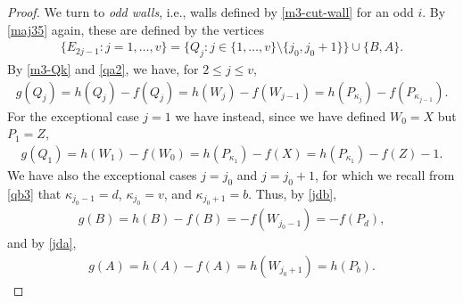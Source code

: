 \documentclass[11pt,reqno,tbtags,a4paper]{amsart}
\numberwithin{equation}{section}
\renewcommand\le{\leq}
\renewcommand\leq{\leqslant}
\theoremstyle{plain}%
\theoremstyle{definition}
\theoremstyle{remark}
\newcounter{cases}
\newcommand\set[1]{\ensuremath{\{#1\}}}
\newcommand\bigset[1]{\ensuremath{\bigl\{#1\bigr\}}}
\newcommand\kk{\kappa}
\newcommand\0{{\boldsymbol 0}}
\newcommand\1{{\boldsymbol 1}}
\begin{document}
\begin{proof}
We turn to \emph{odd walls}, i.e., walls defined by \eqref{m3-cut-wall}
for an odd $i$.
By \eqref{maj35} again, these are defined by the vertices
\begin{align}\label{ow1}
  \set{E_{2j-1}:j=1,\dots,v}
=\bigset{Q_j:j\in\set{1,\dots,v}\setminus\set{j_0,j_0+1}}
\cup\set{B,A}.
\end{align}
By \eqref{m3-Qk} and \eqref{qa2}, we have, for $2\le j\le v$,
\begin{align}\label{ow2}
  g(Q_j) =h(Q_j)-f(Q_j) = h(W_j) - f(W_{j-1})
=h(P_{\kk_j})-f(P_{\kk_{j-1}}).
\end{align}
For the exceptional case $j=1$ we have instead, since we have defined
$W_0=X$ but $P_1=Z$,
\begin{align}\label{ow3}
  g(Q_1) = h(W_1) - f(W_{0})
=h(P_{\kk_1})-f(X)
=h(P_{\kk_1})-f(Z)-1.
\end{align}
We have also the exceptional cases $j=j_0$ and $j=j_0+1$, for which we
recall from \eqref{qb3} that $\kk_{j_0-1}=d$,  $\kk_{j_0}=v$, and $\kk_{j_0+1}=b$.
Thus,
by \eqref{jdb},
\begin{align}\label{ow4}
  g(B)=h(B)-f(B) = -f(W_{j_0-1})=-f(P_d),
\end{align}
and by \eqref{jda},
\begin{align}\label{ow5}
  g(A)=h(A)-f(A) = h(W_{j_0+1})=h(P_b).
\end{align}


\end{proof}
\end{document}
